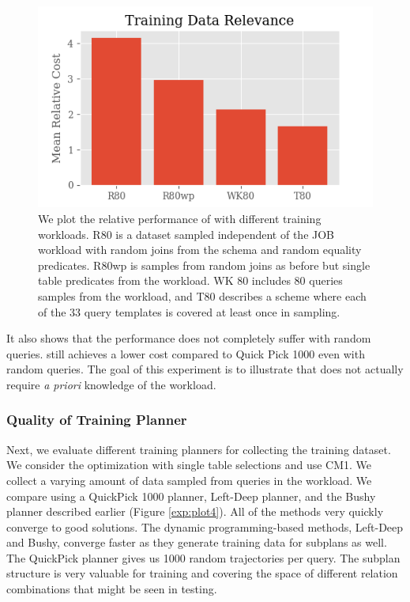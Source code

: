 \begin{figure}
    \centering
    \includegraphics[width=0.8\columnwidth]{exp/exp2_plot2.png}
    \caption{\small{
    We plot the relative performance of \sys with different training workloads. R80 is a dataset sampled independent of the JOB workload with random joins from the schema and random equality predicates. R80wp is samples from random joins as before but single table predicates from the workload. WK 80 includes 80 queries samples from the workload, and T80 describes a scheme where each of the 33 query templates is covered at least once in sampling.
    }\label{exp:plot3}}
\end{figure}

It also shows that the performance does not completely suffer with random queries. 
\sys still achieves a lower cost compared to Quick Pick 1000 even with random queries.
The goal of this experiment is to illustrate that \sys does not actually require \emph{a priori} knowledge of the workload.

\subsubsection{Quality of Training Planner}
Next, we evaluate different training planners for collecting the training dataset.  We consider the optimization with single table selections and use CM1. We collect a varying amount of data sampled from queries in the workload. We compare using a QuickPick 1000 planner, Left-Deep planner, and the Bushy planner described earlier (Figure \ref{exp:plot4}).  All of the methods very quickly converge to good solutions. The dynamic programming-based methods, Left-Deep and Bushy, converge faster as they generate training data for subplans as well. The QuickPick planner gives us 1000 random trajectories per query.
The subplan structure is very valuable for training and covering the space of different relation combinations that might be seen in testing.


